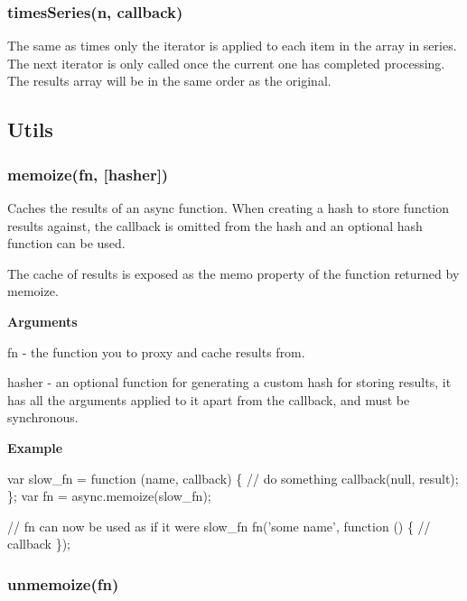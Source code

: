 \label{_timesSeries}%
 \subsubsection*{times\+Series(n, callback)}

The same as times only the iterator is applied to each item in the array in series. The next iterator is only called once the current one has completed processing. The results array will be in the same order as the original.

\subsection*{Utils}

\label{_memoize}%
 \subsubsection*{memoize(fn, \mbox{[}hasher\mbox{]})}

Caches the results of an async function. When creating a hash to store function results against, the callback is omitted from the hash and an optional hash function can be used.

The cache of results is exposed as the {\ttfamily memo} property of the function returned by {\ttfamily memoize}.

{\bfseries Arguments}


\begin{DoxyItemize}
\item fn -\/ the function you to proxy and cache results from.
\item hasher -\/ an optional function for generating a custom hash for storing results, it has all the arguments applied to it apart from the callback, and must be synchronous.
\end{DoxyItemize}

{\bfseries Example}


\begin{DoxyCode}
var slow\_fn = \textcolor{keyword}{function} (name, callback) \{
    \textcolor{comment}{// do something}
    callback(null, result);
\};
var fn = async.memoize(slow\_fn);

\textcolor{comment}{// fn can now be used as if it were slow\_fn}
fn(\textcolor{stringliteral}{'some name'}, \textcolor{keyword}{function} () \{
    \textcolor{comment}{// callback}
\});
\end{DoxyCode}


\label{_unmemoize}%
 \subsubsection*{unmemoize(fn)}

